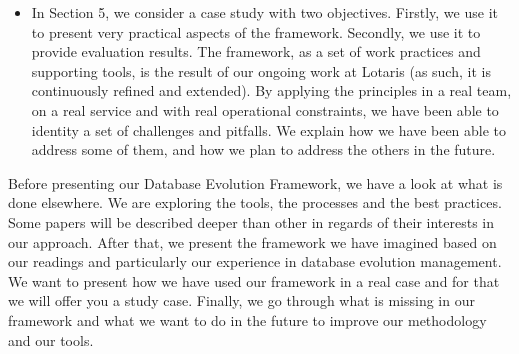 \begin{itemize}
\item In Section 5, we consider a case study with two objectives. Firstly, we use it to present very practical aspects of the framework. Secondly, we use it to provide evaluation results. The framework, as a set of work practices and supporting tools, is the result of our ongoing work at Lotaris (as such, it is continuously refined and extended). By applying the principles in a real team, on a real service and with real operational constraints, we have been able to identity a set of challenges and pitfalls. We explain how we have been able to address some of them, and how we plan to address the others in the future.

\end{itemize}



Before presenting our Database Evolution Framework, we have a look at what is done elsewhere. We are exploring the tools, the processes and the best practices. Some papers will be described deeper than other in regards of their interests in our approach. After that, we present the framework we have imagined based on our readings and particularly our experience in database evolution management. We want to present how we have used our framework in a real case and for that we will offer you a study case. Finally, we go through what is missing in our framework and what we want to do in the future to improve our methodology and our tools.
